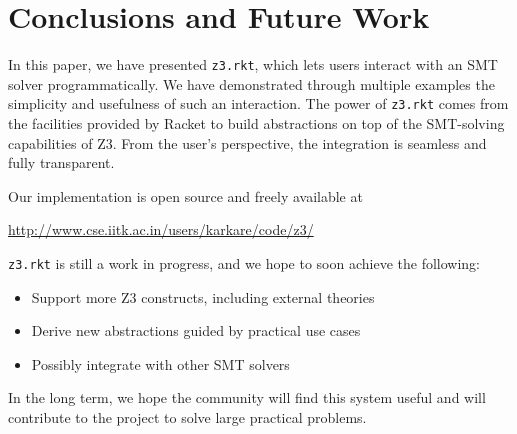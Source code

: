 \section{Conclusions and Future Work}

In this paper, we have presented \texttt{z3.rkt}, which lets users interact
with an SMT solver programmatically. We have demonstrated through multiple
examples the simplicity and usefulness of such an interaction. The power of
\texttt{z3.rkt} comes from the facilities provided by Racket to build
abstractions on top of the SMT-solving capabilities of Z3. From the user's
perspective, the integration is seamless and fully transparent.

Our implementation is open source and freely available at
\begin{center}
\url{http://www.cse.iitk.ac.in/users/karkare/code/z3/}
\end{center}

\texttt{z3.rkt} is still a work in progress, and we hope to soon achieve the
following:

\begin{itemize}
\item Support more Z3 constructs, including external theories
\item Derive new abstractions guided by practical use cases
\item Possibly integrate with other SMT solvers
\end{itemize}

In the long term, we hope the community will find this system useful and will
contribute to the project to solve large practical problems.
